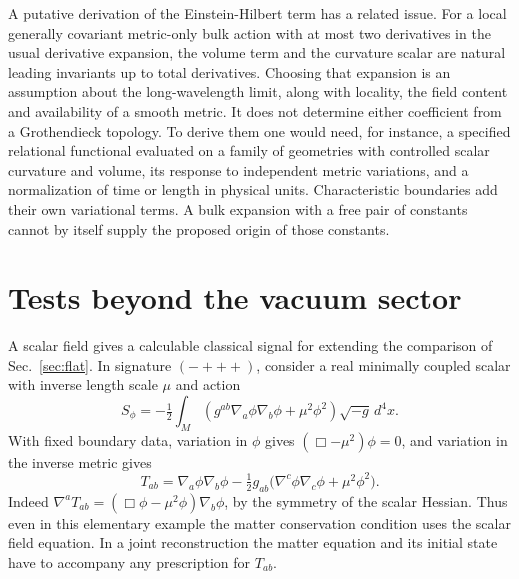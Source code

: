 \documentclass[11pt,letterpaper]{article}
\begin{document}
A putative derivation of the Einstein-Hilbert term has a related issue.
For a local generally covariant metric-only bulk action with at most
two derivatives in the usual derivative expansion, the volume term and
the curvature scalar are natural leading invariants up to total
derivatives. Choosing that expansion is an assumption about the
long-wavelength limit, along with locality, the field content and
availability of a smooth metric. It does not determine either coefficient
from a Grothendieck topology. To derive them one would need, for instance,
a specified relational functional evaluated on a family of geometries
with controlled scalar curvature and volume, its response to independent
metric variations, and a normalization of time or length in physical
units. Characteristic boundaries add their own variational terms. A
bulk expansion with a free pair of constants cannot by itself supply
the proposed origin of those constants.

\section{Tests beyond the vacuum sector}
\label{sec:regimes}
A scalar field gives a calculable classical signal for extending the
comparison of Sec.~\ref{sec:flat}. In signature \((-+++)\), consider
a real minimally coupled scalar with inverse length scale \(\mu\) and action
\[
 S_\phi=-\tfrac12\int_M\!
        \left(g^{ab}\nabla_a\phi\nabla_b\phi+\mu^2\phi^2\right)
                          \sqrt{-g}\,d^4x .
\]
With fixed boundary data, variation in \(\phi\) gives
\((\Box-\mu^2)\phi=0\), and variation in the inverse metric gives
\[
 T_{ab}=\nabla_a\phi\nabla_b\phi-
 \tfrac12g_{ab}\bigl(\nabla^c\phi\nabla_c\phi+\mu^2\phi^2\bigr).
\]
Indeed \(\nabla^aT_{ab}=(\Box\phi-\mu^2\phi)\nabla_b\phi\), by the
symmetry of the scalar Hessian. Thus even in this elementary example
the matter conservation condition uses the scalar field equation. In a
joint reconstruction the matter equation and its initial state have to
accompany any prescription for \(T_{ab}\).
\end{document}
